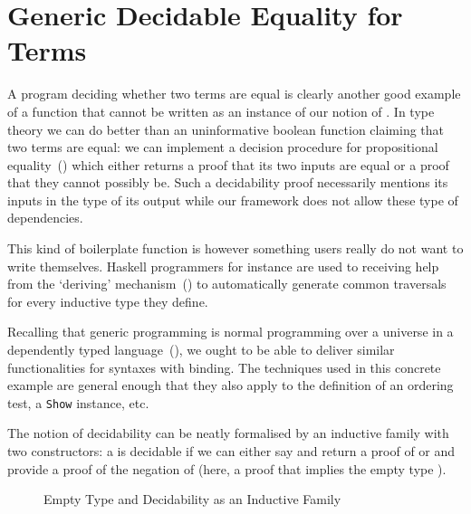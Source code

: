 \section{Generic Decidable Equality for Terms}

A program deciding whether two terms are equal is clearly another good
example of a function that cannot be written as an instance of our notion
of . In type theory we can do better than an uninformative
boolean function claiming that two terms are equal: we can implement a
decision procedure for propositional equality~(\cite{DBLP:conf/icfp/LohM11})
which either returns a proof that its two inputs are equal or a proof that
they cannot possibly be. Such a decidability proof necessarily mentions
its inputs in the type of its output while our framework does not allow
these type of dependencies.

This kind of boilerplate function is however something users really do
not want to write themselves. Haskell programmers for instance are used
to receiving help from the `deriving'
mechanism~(\cite{DBLP:journals/entcs/HinzeJ00,DBLP:conf/haskell/MagalhaesDJL10})
to automatically generate common traversals for every inductive type
they define.

Recalling that generic programming is normal programming over a universe
in a dependently typed language~(\cite{DBLP:conf/ifip2-1/AltenkirchM02}),
we ought to be able to deliver similar functionalities for syntaxes with
binding. The techniques used in this concrete example are general enough
that they also apply to the definition of an ordering test, a \texttt{Show}
instance, etc.

The notion of decidability can be neatly formalised by an inductive family
with two constructors: a   is decidable if we can either say
 and return a proof of  or  and provide a proof of
the negation of  (here, a proof that  implies the empty type
).

\begin{figure}[h]
\begin{minipage}[t]{0.45\textwidth}
\end{minipage}
\begin{minipage}[t]{0.45\textwidth}
\end{minipage}
\caption{Empty Type and Decidability as an Inductive Family}
\end{figure}

